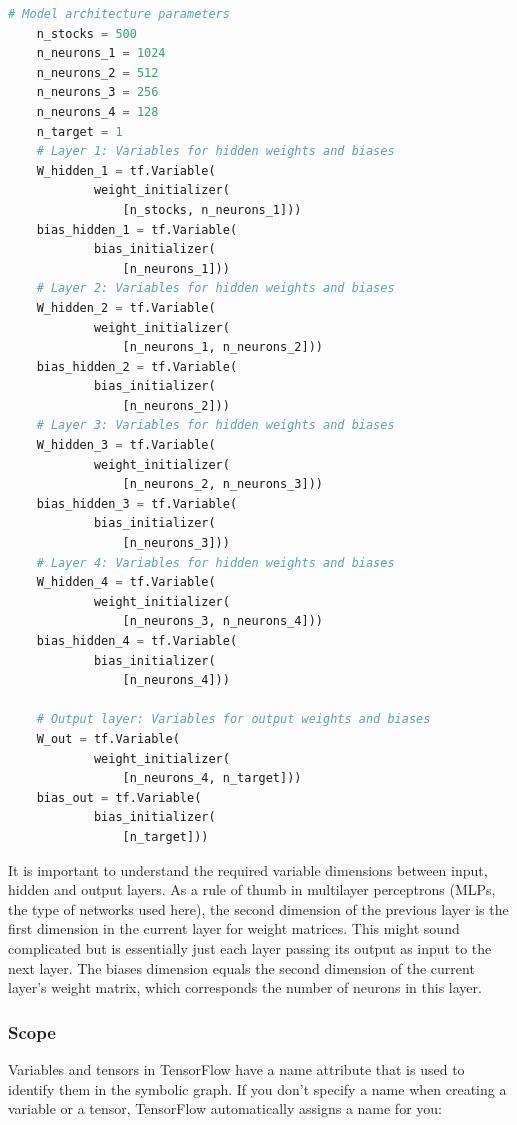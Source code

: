 \begin{lstlisting}[language=Python]
    # Model architecture parameters
    n_stocks = 500
    n_neurons_1 = 1024
    n_neurons_2 = 512
    n_neurons_3 = 256
    n_neurons_4 = 128
    n_target = 1
    # Layer 1: Variables for hidden weights and biases
    W_hidden_1 = tf.Variable(
            weight_initializer(
                [n_stocks, n_neurons_1]))
    bias_hidden_1 = tf.Variable(
            bias_initializer(
                [n_neurons_1]))
    # Layer 2: Variables for hidden weights and biases
    W_hidden_2 = tf.Variable(
            weight_initializer(
                [n_neurons_1, n_neurons_2]))
    bias_hidden_2 = tf.Variable(
            bias_initializer(
                [n_neurons_2]))
    # Layer 3: Variables for hidden weights and biases
    W_hidden_3 = tf.Variable(
            weight_initializer(
                [n_neurons_2, n_neurons_3]))
    bias_hidden_3 = tf.Variable(
            bias_initializer(
                [n_neurons_3]))
    # Layer 4: Variables for hidden weights and biases
    W_hidden_4 = tf.Variable(
            weight_initializer(
                [n_neurons_3, n_neurons_4]))
    bias_hidden_4 = tf.Variable(
            bias_initializer(
                [n_neurons_4]))
    
    # Output layer: Variables for output weights and biases
    W_out = tf.Variable(
            weight_initializer(
                [n_neurons_4, n_target]))
    bias_out = tf.Variable(
            bias_initializer(
                [n_target]))
\end{lstlisting}

It is important to understand the required variable dimensions between input, hidden and output layers. As a rule of thumb in multilayer perceptrons (MLPs, the type of networks used here), the second dimension of the previous layer is the first dimension in the current layer for weight matrices. This might sound complicated but is essentially just each layer passing its output as input to the next layer. The biases dimension equals the second dimension of the current layer’s weight matrix, which corresponds the number of neurons in this layer.

\subsubsection{Scope}

Variables and tensors in TensorFlow have a name attribute that is used to identify them in the symbolic graph. If you don't specify a name when creating a variable or a tensor, TensorFlow automatically assigns a name for you:

